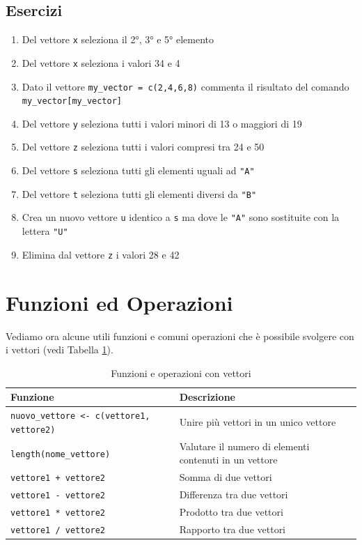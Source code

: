 \documentclass[
]{book}
\providecommand{\tightlist}{%
  \setlength{\itemsep}{0pt}\setlength{\parskip}{0pt}}
\begin{document}
\hypertarget{esercizi-3}{%
\subsection*{Esercizi}\label{esercizi-3}}

\begin{enumerate}
\def\labelenumi{\arabic{enumi}.}
\tightlist
\item
  Del vettore \texttt{x} seleziona il 2°, 3° e 5° elemento
\item
  Del vettore \texttt{x} seleziona i valori 34 e 4
\item
  Dato il vettore \texttt{my\_vector\ =\ c(2,4,6,8)} commenta il risultato del comando \texttt{my\_vector{[}my\_vector{]}}
\item
  Del vettore \texttt{y} seleziona tutti i valori minori di 13 o maggiori di 19
\item
  Del vettore \texttt{z} seleziona tutti i valori compresi tra 24 e 50
\item
  Del vettore \texttt{s} seleziona tutti gli elementi uguali ad \texttt{"A"}
\item
  Del vettore \texttt{t} seleziona tutti gli elementi diversi da \texttt{"B"}
\item
  Crea un nuovo vettore \texttt{u} identico a \texttt{s} ma dove le \texttt{"A"} sono sostituite con la lettera \texttt{"U"}
\item
  Elimina dal vettore \texttt{z} i valori 28 e 42
\end{enumerate}

\hypertarget{vector-functions}{%
\section{Funzioni ed Operazioni}\label{vector-functions}}

Vediamo ora alcune utili funzioni e comuni operazioni che è possibile svolgere con i vettori (vedi Tabella \ref{tab:table-vector-operators}).

\begin{table}[!h]

\caption{\label{tab:table-vector-operators}Funzioni e  operazioni con vettori}
\centering
\begin{tabular}[t]{l|l}
\hline
Funzione & Descrizione\\
\hline
\texttt{nuovo\_vettore <- c(vettore1, vettore2)} & Unire più vettori in un unico vettore\\
\hline
\texttt{length(nome\_vettore)} & Valutare il numero di elementi contenuti in un vettore\\
\hline
\texttt{vettore1 + vettore2} & Somma di due vettori\\
\hline
\texttt{vettore1 - vettore2} & Differenza tra due vettori\\
\hline
\texttt{vettore1 * vettore2} & Prodotto tra due vettori\\
\hline
\texttt{vettore1 / vettore2} & Rapporto tra due vettori\\
\hline
\end{tabular}
\end{table}
\end{document}
